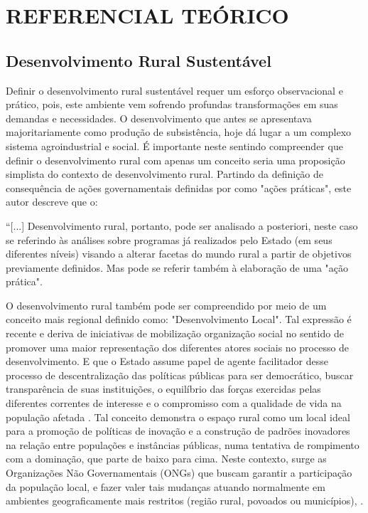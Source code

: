 \chapter{REFERENCIAL TEÓRICO}

\section{Desenvolvimento Rural Sustentável}

Definir o desenvolvimento rural sustentável requer um esforço observacional e prático, pois, este ambiente vem sofrendo profundas transformações em suas demandas e necessidades. O desenvolvimento que antes se apresentava majoritariamente como produção de subsistência, hoje dá lugar a um complexo sistema agroindustrial \cite{bastos_determinantes_2018} e social. É importante neste sentindo compreender que definir o desenvolvimento rural com apenas um conceito seria uma proposição simplista do contexto de desenvolvimento rural. Partindo da definição de consequência de ações governamentais definidas por  como "ações práticas", este autor descreve que o:

\begin{citacao}
“[...] Desenvolvimento rural, portanto, pode ser analisado a posteriori, neste caso se referindo às análises sobre programas já realizados pelo Estado (em seus diferentes níveis) visando a alterar facetas do mundo rural a partir de objetivos previamente definidos. Mas pode se referir também à elaboração de uma "ação prática".
\end{citacao}

O desenvolvimento rural também pode ser compreendido por meio de um conceito mais regional definido como: "Desenvolvimento Local". Tal expressão é recente e deriva de iniciativas de mobilização organização social no sentido de promover uma maior representação dos diferentes atores sociais no processo de desenvolvimento. E que o Estado assume papel de agente facilitador desse processo de descentralização das políticas públicas para ser democrático, buscar transparência de suas instituições, o equilíbrio das forças exercidas pelas diferentes correntes de interesse e o compromisso com a qualidade de vida na população afetada  \cite{campanhola_diretrizes_2000}. 
Tal conceito demonstra o espaço rural como um local ideal para a promoção de políticas de inovação e a construção de padrões inovadores na relação entre populações e instâncias públicas, numa tentativa de rompimento com a dominação, que parte de baixo para cima. Neste contexto, surge as Organizações Não Governamentais (ONGs) que buscam garantir a participação da população local, e fazer valer tais mudanças atuando normalmente em ambientes geograficamente mais restritos (região rural, povoados ou municípios),  \cite{assis_agricultura_2005, campanhola_diretrizes_2000}.

